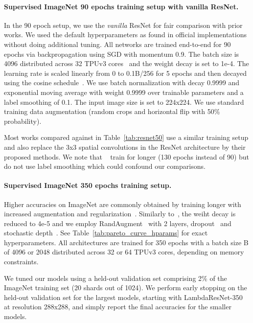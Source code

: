 \documentclass{article} \usepackage{iclr2021_conference,times}
\begin{document}
\vspace{-0.1cm}
\paragraph{Supervised ImageNet 90 epochs training setup with vanilla ResNet.}
In the 90 epoch setup, we use the \emph{vanilla} ResNet for fair comparison with prior works.
We used the default hyperparameters as found in official implementations without doing additional tuning.
All networks are trained end-to-end for 90 epochs via backpropagation using SGD with momentum 0.9.
The batch size  is 4096 distributed across 32 TPUv3 cores~\citep{jouppiTPU} and the weight decay is set to 1e-4.
The learning rate is scaled linearly from 0 to 0.1B/256 for 5 epochs and then decayed using the cosine schedule~\citep{loshchilov2016sgdr}.
We use batch normalization with decay 0.9999 and exponential moving average with weight 0.9999 over trainable parameters and a label smoothing of 0.1.
The input image size is set to 224x224.
We use standard training data augmentation (random crops and horizontal flip with 50\% probability).

Most works compared against in Table~\ref{tab:resnet50} use a similar training setup and also replace the 3x3 spatial convolutions in the ResNet architecture by their proposed methods.
We note that ~\cite{ramachandran2019sasa} train for longer (130 epochs instead of 90) but do not use label smoothing which could confound our comparisons.

\vspace{-0.1cm}
\paragraph{Supervised ImageNet 350 epochs training setup.}
Higher accuracies on ImageNet are commonly obtained by training longer with increased augmentation and regularization~\citep{lee2020compounding,tan2019efficientnet}.
Similarly to~\cite{bello2021revisiting}, the weiht decay is reduced to 4e-5 and we employ RandAugment~\citep{cubuk2019randaugment} with 2 layers, dropout~\citep{JMLR:v15:srivastava14a} and stochastic depth~\citep{huang2016deep}.
See Table~\ref{tab:pareto_curve_hparams} for exact hyperparameters.
All architectures are trained for 350 epochs with a batch size B of 4096 or 2048 distributed
across 32 or 64 TPUv3 cores, depending on memory constraints.

We tuned our models using a held-out validation set comprising 2\% of the ImageNet training set (20 shards out of 1024).
We perform early stopping on the held-out validation set for the largest models, starting with LambdaResNet-350 at resolution 288x288, and simply report the final accuracies for the smaller models.
\end{document}
